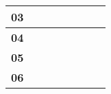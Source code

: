 \begin{table}[ht]
\begin{tabular}{|l|l|llll|l|l|}
    \textbf{03}                                                                 &                                                                                              & \multicolumn{1}{l|}{}                                   & \multicolumn{1}{l|}{}                                   & \multicolumn{1}{l|}{}                                   &                                                         &                                                                                                  &                                                                                                    \\ \hline
    \textbf{04}                                                                 &                                                                                              & \multicolumn{1}{l|}{}                                   & \multicolumn{1}{l|}{}                                   & \multicolumn{1}{l|}{}                                   &                                                         &                                                                                                  &                                                                                                    \\ \hline
    \textbf{05}                                                                 &                                                                                              & \multicolumn{1}{l|}{}                                   & \multicolumn{1}{l|}{}                                   & \multicolumn{1}{l|}{}                                   &                                                         &                                                                                                  &                                                                                                    \\ \hline
    \textbf{06}                                                                 &                                                                                              & \multicolumn{1}{l|}{}                                   & \multicolumn{1}{l|}{}                                   & \multicolumn{1}{l|}{}                                   &                                                         &                                                                                                  &                                                                                                    \\ \hline

\end{tabular}
\end{table}
